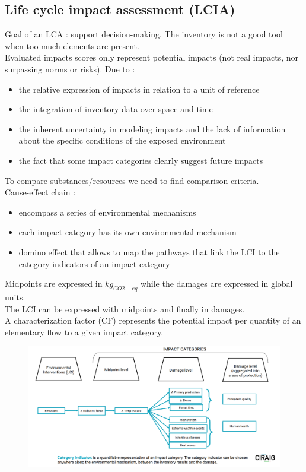 \documentclass[../main.tex]{subfiles}
\begin{document}
\subsection{Life cycle impact assessment (LCIA)}
Goal of an LCA : support decision-making. The inventory is not a good tool when too much elements are present.\\
Evaluated impacts scores only represent potential impacts (not real impacts, nor surpassing norms or risks). Due to : \begin{itemize}
    \item the relative expression of impacts in relation to a unit of reference
    \item the integration of inventory data over space and time
    \item the inherent uncertainty in modeling impacts and the lack of information about the specific conditions of the exposed environment
    \item the fact that some impact categories clearly suggest future impacts
\end{itemize}

To compare substances/resources we need to find comparison criteria.\\
Cause-effect chain : \begin{itemize}
    \item encompass a series of environmental mechanisms
    \item each impact category has its own environmental mechanism 
    \item domino effect that allows to map the pathways that link the LCI to the category indicators of an impact category
\end{itemize}
Midpoints are expressed in $kg_{CO2-eq}$ while the damages are expressed in global units. \\
The LCI can be expressed with midpoints and finally in damages.\\
A characterization factor (CF) represents the potential impact per quantity of an elementary flow to a given impact category.\\

\begin{figure}[hbt!]
    \centering
    \includegraphics[width=0.7\linewidth]{IMAGES/LCA/Screenshot from 2024-11-12 17-24-00.png}
\end{figure}
\end{document}
